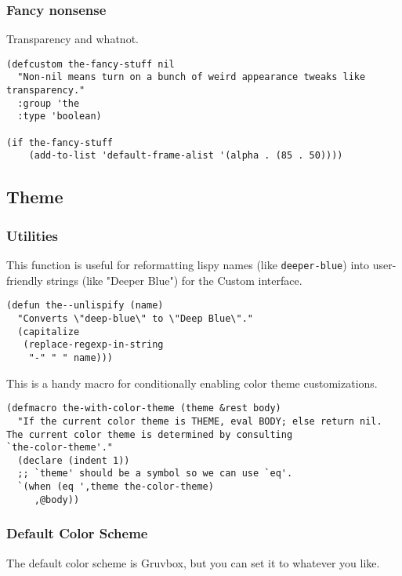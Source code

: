 \documentclass[11pt]{article}
\begin{document}
\subsubsection{Fancy nonsense}
\label{sec:orgd9c2127}
Transparency and whatnot.
\begin{verbatim}
(defcustom the-fancy-stuff nil
  "Non-nil means turn on a bunch of weird appearance tweaks like
transparency."
  :group 'the
  :type 'boolean)

(if the-fancy-stuff
    (add-to-list 'default-frame-alist '(alpha . (85 . 50))))
\end{verbatim}
\subsection{Theme}
\label{sec:org6c588bb}
\subsubsection{Utilities}
\label{sec:org7a82235}

This function is useful for reformatting lispy names (like
\texttt{deeper-blue}) into user-friendly strings (like "Deeper Blue") for
the Custom interface.
\begin{verbatim}
(defun the--unlispify (name)
  "Converts \"deep-blue\" to \"Deep Blue\"."
  (capitalize
   (replace-regexp-in-string
    "-" " " name)))
\end{verbatim}

This is a handy macro for conditionally enabling color theme
customizations.
\begin{verbatim}
(defmacro the-with-color-theme (theme &rest body)
  "If the current color theme is THEME, eval BODY; else return nil.
The current color theme is determined by consulting
`the-color-theme'."
  (declare (indent 1))
  ;; `theme' should be a symbol so we can use `eq'.
  `(when (eq ',theme the-color-theme)
     ,@body))
\end{verbatim}

\subsubsection{Default Color Scheme}
\label{sec:org71874d7}

The default color scheme is Gruvbox, but you can set it to whatever
you like.
\end{document}
